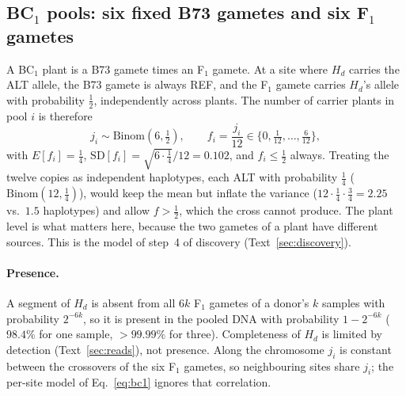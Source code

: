 \documentclass[11pt]{article}
\newcommand{\Bin}{\mathrm{Binom}}
\newcommand{\Hd}{H_d}
\begin{document}
\subsection{BC$_1$ pools: six fixed B73 gametes and six F$_1$ gametes}
\label{sec:bc1pool}
A BC$_1$ plant is a B73 gamete times an F$_1$ gamete. At a site where $\Hd$ carries the ALT allele, the B73 gamete is always REF, and the
F$_1$ gamete carries $\Hd$'s allele with probability $\tfrac12$, independently across plants. The number of carrier plants in pool $i$ is
therefore
\begin{equation}
j_i\sim\Bin(6,\tfrac12),\qquad f_i=\frac{j_i}{12}\in\{0,\tfrac1{12},\dots,\tfrac6{12}\},
\label{eq:bc1}
\end{equation}
with $E[f_i]=\tfrac14$, $\mathrm{SD}[f_i]=\sqrt{6\cdot\tfrac14}/12=0.102$, and $f_i\le\tfrac12$ always. Treating the twelve copies as
independent haplotypes, each ALT with probability $\tfrac14$ ($\Bin(12,\tfrac14)$), would keep the mean but inflate the variance
($12\cdot\tfrac14\cdot\tfrac34=2.25$ vs.\ $1.5$ haplotypes) and allow $f>\tfrac12$, which the cross cannot produce. The plant level is what
matters here, because the two gametes of a plant have different sources. This is the model of step~4 of discovery
(Text~\ref{sec:discovery}).

\paragraph{Presence.} A segment of $\Hd$ is absent from all $6k$ F$_1$ gametes of a donor's $k$ samples with probability $2^{-6k}$, so it is
present in the pooled DNA with probability $1-2^{-6k}$ ($98.4\%$ for one sample, $>99.99\%$ for three). Completeness of $\Hd$ is limited by
detection (Text~\ref{sec:reads}), not presence. Along the chromosome $j_i$ is constant between the crossovers of the six F$_1$ gametes, so
neighbouring sites share $j_i$; the per-site model of Eq.~\eqref{eq:bc1} ignores that correlation.
\end{document}
